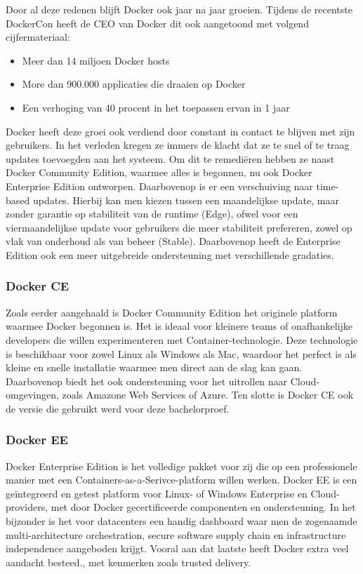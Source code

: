 Door al deze redenen blijft Docker ook jaar na jaar groeien. Tijdens de recentste DockerCon heeft de CEO van Docker dit ook aangetoond met volgend cijfermateriaal:
\begin{itemize}[noitemsep]
	\item Meer dan 14 miljoen Docker hosts
	\item More dan 900.000 applicaties die draaien op Docker
	\item Een verhoging van 40 procent in het toepassen ervan in 1 jaar
\end{itemize}

Docker heeft deze groei ook verdiend door constant in contact te blijven met zijn gebruikers. In het verleden kregen ze immers de klacht dat ze te snel of te traag updates toevoegden aan het systeem. Om dit te remediëren hebben ze naast Docker Community Edition, waarmee alles is begonnen, nu ook Docker Enterprise Edition ontworpen. Daarbovenop is er een verschuiving naar time-based updates. Hierbij kan men kiezen tussen een maandelijkse update, maar zonder garantie op stabiliteit van de runtime (Edge), ofwel voor een viermaandelijkse update voor gebruikers die meer stabiliteit prefereren, zowel op vlak van onderhoud als van beheer (Stable). Daarbovenop heeft de Enterprise Edition ook een meer uitgebreide ondersteuning met verschillende gradaties.

\subsubsection{Docker CE}
Zoals eerder aangehaald is Docker Community Edition het originele platform waarmee Docker begonnen is. Het is ideaal voor kleinere teams of onafhankelijke developers die willen experimenteren met Container-technologie. Deze technologie is beschikbaar voor zowel Linux als Windows als Mac, waardoor het perfect is als kleine en snelle installatie waarmee men direct aan de slag kan gaan. Daarbovenop biedt het ook ondersteuning voor het uitrollen naar Cloud-omgevingen, zoals Amazone Web Services of Azure. Ten slotte is Docker CE ook de versie die gebruikt werd voor deze bachelorproef.

\subsubsection{Docker EE}
Docker Enterprise Edition is het volledige pakket voor zij die op een professionele manier met een Containers-as-a-Serivce-platform willen werken. Docker EE is een geïntegreerd en getest platform voor Linux- of Windows Enterprise en Cloud-providers, met door Docker gecertificeerde componenten en ondersteuning. In het bijzonder is het voor datacenters een handig dashboard waar men de zogenaamde multi-architecture orchestration, secure software supply chain en infrastructure independence aangeboden krijgt. Vooral aan dat laatste heeft Docker extra veel aandacht besteed., met kenmerken zoals trusted delivery.

